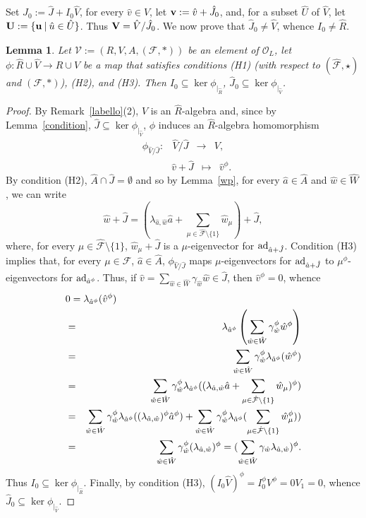 \documentclass[a4paper]{amsart}
\newtheorem{lemma}{Lemma}[section]
\newcommand{\A}{ {\hat A}}
\newcommand{\Vo}{{\bf V}}
\newcommand{\So}{{\hat {\mathcal F}}}
\newcommand{\ad}{{\rm ad}}
\newcommand{\aV}{{\hat V}}
\newcommand{\aR}{{\hat R}}
\newcommand{\hW}{{\hat W}}
\newcommand{\hJ}{{\hat J}}
\newcommand{\ha}{{\hat a}}
\newcommand{\hw}{{\hat w}}
\newcommand{\hv}{{\hat v}}
\newcommand{\hu}{{\hat u}}
\newcommand{\bv}{{\bf v}}
\newcommand{\bu}{{\bf u}}
\begin{document}
Set $\hJ_0:=\hJ+I_0\aV$, for every $\hv\in \hat V$, let $\bv:=\hv+\hJ_0$, and, for a subset $\hat U$ of $\hat V$, let ${\bf U}:=\{\bu\:|\:\hu\in \hat U\}$. Thus $\Vo=\aV/\hJ_0$. We now prove that $\hJ_0\neq \hat V$, whence $I_0\neq \hat R$. 

\begin{lemma}\label{contained}
Let ${\mathcal V}:=(R, V, A, (\mathcal F, \ast) )$ be an element of  $\mathcal O_L$, let $\phi\colon \aR\cup\aV  \to R\cup V$ be a map  that satisfies conditions (H1) (with respect to $(\So,\star)$ and $(\mathcal F, \ast)$), (H2), and (H3). Then $I_0\subseteq \ker \phi_{|_{\aR}}$,  $\hJ_0\subseteq  \ker \phi_{|_{\aV}}$. 
\end{lemma}
\begin{proof}
 By Remark~\ref{labello}(2), $V$ is an $\aR$-algebra and, since by Lemma~\ref{condition},  $\hJ\subseteq \ker \phi_{|_{\aV}}$,  
$\phi$ induces an $\aR$-algebra homomorphism 
$$\begin{array}{clcl}
\phi_{\aV/\hJ}:&\aV/\hJ&\to &V,
\end{array}$$
$$\:\:\:\:\:\:\:\:\:\:\:\:\:\begin{array}{clcl}
& \hv+\hJ&\mapsto &\hv^{\phi}.
\end{array}
$$
By condition (H2), $\A\cap \hJ=\emptyset$ and so by Lemma~\ref{wp},  for every $\ha\in \A$ and $\hw\in \hW$, we can write   
$$
\hw+\hJ=(\lambda_{\ha,\hw}\ha+\sum_{\mu \in \So\setminus \{1\}} \hw_\mu)+  \hJ,
$$
where, for every $\mu\in \So\setminus \{1\}$, $\hw_\mu+\hJ$ is a $\mu$-eigenvector for $\ad_{\ha+\hJ}$. 
 Condition (H3) implies that, for every $\mu\in \mathcal F$, $\ha\in \A$, $\phi_{\aV/\hJ}$ maps $\mu$-eigenvectors for $\ad_{\ha+\hJ}$ to  $\mu^{\phi}$-eigenvectors for $\ad_{\ha^{\phi}}$. Thus, if $\hv=\sum_{\hw\in \hW}\gamma_\hw \hw\in \hJ$, then $\hv^{\phi}=0$, whence
\begin{eqnarray*}
\lefteqn{0=\lambda_{\ha^{\phi}}(\hv^{\phi})}\\
&=&\lambda_{\ha^{\phi}}\left (\sum_{\hw\in \hW}\gamma_\hw^{\phi}\hw^{\phi}\right )\\
&=& \sum_{\hw\in \hW}\gamma_\hw^{\phi} \lambda_{\ha^{\phi}}(\hw^{\phi})\\
&=&  \sum_{\hw\in \hW}\gamma_\hw^{\phi} \lambda_{\ha^{\phi}}((\lambda_{\ha,\hw}\ha+\sum_{\mu \in \So\setminus \{1\}} \hw_\mu)^{\phi})\\
&=&   \sum_{\hw\in \hW}\gamma_\hw^{\phi} \lambda_{\ha^{\phi}}((\lambda_{\ha,\hw})^{\phi}\ha^{\phi})+\sum_{\hw\in \hW}\gamma_\hw^{\phi} \lambda_{\ha^{\phi}}(\sum_{\mu \in \So\setminus \{1\}} \hw_\mu^{\phi}))\\
&=&   \sum_{\hw\in \hW}\gamma_\hw^{\phi}(\lambda_{\ha,\hw})^{\phi}=(\sum_{\hw\in \hW}\gamma_\hw\lambda_{\ha,\hw})^{\phi}.
\end{eqnarray*}
Thus $I_0\subseteq \ker \phi_{|_{\aR}}$. Finally, by condition (H3), $(I_0\aV)^{\phi}=I_0^{\phi}V^{\phi}=0V_1=0$, whence $\hJ_0\subseteq \ker \phi_{|_{\aV}}$.
\end{proof}
\end{document}
